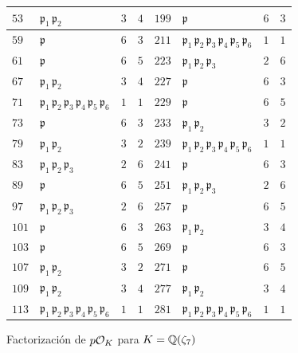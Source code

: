 \begin{figure}
\begin{center}
\begin{tabular}{x{1cm}x{2.5cm}x{1cm}x{1.25cm}x{1cm}x{2.5cm}x{1cm}x{1.25cm}}
      \hline
      $53$ & $\mathfrak{p}_1\,\mathfrak{p}_2$ & $3$ & $4$ & $199$ & $\mathfrak{p}$ & $6$ & $3$ \tabularnewline
      \hline
      $59$ & $\mathfrak{p}$ & $6$ & $3$ & $211$ & $\mathfrak{p}_1\,\mathfrak{p}_2\,\mathfrak{p}_3\,\mathfrak{p}_4\,\mathfrak{p}_5\,\mathfrak{p}_6$ & $1$ & $1$ \tabularnewline
      \hline
      $61$ & $\mathfrak{p}$ & $6$ & $5$ & $223$ & $\mathfrak{p}_1\,\mathfrak{p}_2\,\mathfrak{p}_3$ & $2$ & $6$ \tabularnewline
      \hline
      $67$ & $\mathfrak{p}_1\,\mathfrak{p}_2$ & $3$ & $4$ & $227$ & $\mathfrak{p}$ & $6$ & $3$ \tabularnewline
      \hline
      $71$ & $\mathfrak{p}_1\,\mathfrak{p}_2\,\mathfrak{p}_3\,\mathfrak{p}_4\,\mathfrak{p}_5\,\mathfrak{p}_6$ & $1$ & $1$ & $229$ & $\mathfrak{p}$ & $6$ & $5$ \tabularnewline
      \hline
      $73$ & $\mathfrak{p}$ & $6$ & $3$ & $233$ & $\mathfrak{p}_1\,\mathfrak{p}_2$ & $3$ & $2$ \tabularnewline
      \hline
      $79$ & $\mathfrak{p}_1\,\mathfrak{p}_2$ & $3$ & $2$ & $239$ & $\mathfrak{p}_1\,\mathfrak{p}_2\,\mathfrak{p}_3\,\mathfrak{p}_4\,\mathfrak{p}_5\,\mathfrak{p}_6$ & $1$ & $1$ \tabularnewline
      \hline
      $83$ & $\mathfrak{p}_1\,\mathfrak{p}_2\,\mathfrak{p}_3$ & $2$ & $6$ & $241$ & $\mathfrak{p}$ & $6$ & $3$ \tabularnewline
      \hline
      $89$ & $\mathfrak{p}$ & $6$ & $5$ & $251$ & $\mathfrak{p}_1\,\mathfrak{p}_2\,\mathfrak{p}_3$ & $2$ & $6$ \tabularnewline
      \hline
      $97$ & $\mathfrak{p}_1\,\mathfrak{p}_2\,\mathfrak{p}_3$ & $2$ & $6$ & $257$ & $\mathfrak{p}$ & $6$ & $5$ \tabularnewline
      \hline
      $101$ & $\mathfrak{p}$ & $6$ & $3$ & $263$ & $\mathfrak{p}_1\,\mathfrak{p}_2$ & $3$ & $4$ \tabularnewline
      \hline
      $103$ & $\mathfrak{p}$ & $6$ & $5$ & $269$ & $\mathfrak{p}$ & $6$ & $3$ \tabularnewline
      \hline
      $107$ & $\mathfrak{p}_1\,\mathfrak{p}_2$ & $3$ & $2$ & $271$ & $\mathfrak{p}$ & $6$ & $5$ \tabularnewline
      \hline
      $109$ & $\mathfrak{p}_1\,\mathfrak{p}_2$ & $3$ & $4$ & $277$ & $\mathfrak{p}_1\,\mathfrak{p}_2$ & $3$ & $4$ \tabularnewline
      \hline
      $113$ & $\mathfrak{p}_1\,\mathfrak{p}_2\,\mathfrak{p}_3\,\mathfrak{p}_4\,\mathfrak{p}_5\,\mathfrak{p}_6$ & $1$ & $1$ & $281$ & $\mathfrak{p}_1\,\mathfrak{p}_2\,\mathfrak{p}_3\,\mathfrak{p}_4\,\mathfrak{p}_5\,\mathfrak{p}_6$ & $1$ & $1$ \tabularnewline
      \hline
    \end{tabular}
  \end{center}

  \caption{Factorización de $p\mathcal{O}_K$ para $K = \mathbb{Q} (\zeta_7)$}
  \label{fig:factorizacion-en-Q-zeta-7}
\end{figure}

